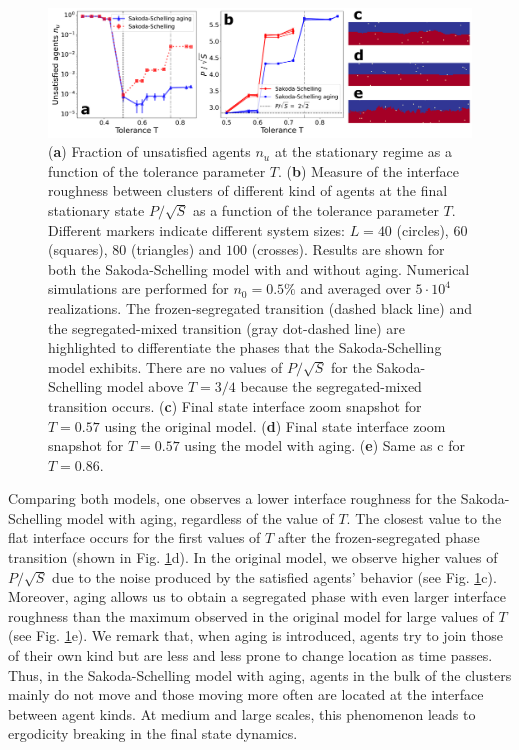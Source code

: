 \begin{figure}
\centering \captionsetup{font=sf}
\includegraphics[width=\linewidth]{Figs/Aging_Schelling/fig7.pdf} 
\caption[Fraction of unsatisfied agents and roughness]{ (\textbf{a}) Fraction of unsatisfied agents $n_u$ at the stationary regime as a function of the tolerance parameter $T$. (\textbf{b}) Measure of the interface roughness between clusters of different kind of agents at the final stationary state $P/\sqrt{S}$ as a function of the tolerance parameter $T$. Different markers indicate different system sizes: $L = 40$ (circles), $60$ (squares), $80$ (triangles) and $100$ (crosses). Results are shown for both the Sakoda-Schelling model with and without aging. Numerical simulations are performed for $n_0 = 0.5\%$ and averaged over $5 \cdot 10^4$ realizations. The frozen-segregated transition (dashed black line) and the segregated-mixed transition (gray dot-dashed line) are highlighted to differentiate the phases that the Sakoda-Schelling model exhibits. There are no values of $P/\sqrt{S}$ for the Sakoda-Schelling model above $T = 3/4$ because the segregated-mixed transition occurs. (\textbf{c}) Final state interface zoom snapshot for $T = 0.57$ using the original model. (\textbf{d}) Final state interface zoom snapshot for $T = 0.57$ using the model with aging.  (\textbf{e}) Same as c for $T = 0.86$.}
\label{Fig2}
\end{figure}

Comparing both models, one observes a lower interface roughness for the Sakoda-Schelling model with aging, regardless of the value of $T$. The closest value to the flat interface occurs for the first values of $T$ after the frozen-segregated phase transition (shown in Fig. \ref{Fig2}d). In the original model, we observe higher values of $P/\sqrt{S}$ due to the noise produced by the satisfied agents' behavior (see Fig. \ref{Fig2}c). Moreover, aging allows us to obtain a segregated phase with even larger interface roughness than the maximum observed in the original model for large values of $T$ (see Fig. \ref{Fig2}e). We remark that, when aging is introduced, agents try to join those of their own kind but are less and less prone to change location as time passes. Thus, in the Sakoda-Schelling model with aging, agents in the bulk of the clusters mainly do not move and those moving more often are located at the interface between agent kinds. At medium and large scales, this phenomenon leads to ergodicity breaking in the final state dynamics.

